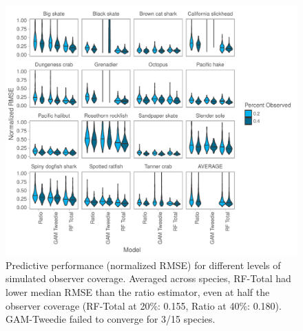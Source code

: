 \documentclass[]{article}
\begin{document}
\begin{figure}

{\centering \includegraphics[width=7in]{bycatch_sim_paper_files/figure-latex/coverage-effects-1} 

}

\caption{Predictive performance (normalized RMSE) for different levels of simulated observer coverage. Averaged across species, RF-Total had lower median RMSE than the ratio estimator, even at half the observer coverage (RF-Total at 20\%: 0.155, Ratio at 40\%: 0.180). GAM-Tweedie failed to converge for 3/15 species.}\label{fig:coverage-effects}
\end{figure}

\pagebreak
\end{document}
